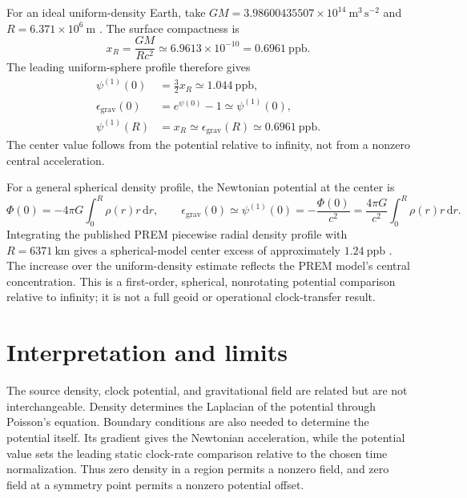 \documentclass[12pt]{article}
\begin{document}
For an ideal uniform-density Earth, take $GM=3.98600435507\times10^{14}\ \mathrm{m^3\,s^{-2}}$ and $R=6.371\times10^6\ \mathrm{m}$ \cite{Park2021}. The surface compactness is
\begin{equation}
  x_R=\frac{GM}{Rc^2}\simeq6.9613\times10^{-10}
  =0.6961\ \mathrm{ppb}.
  \label{eq:earth-compactness}
\end{equation}
The leading uniform-sphere profile therefore gives
\begin{equation}
  \begin{aligned}
    \psi^{(1)}(0)&=\frac{3}{2}x_R\simeq1.044\ \mathrm{ppb},\\
    \epsilon_{\mathrm{grav}}(0)&=e^{\psi(0)}-1\simeq\psi^{(1)}(0),\\
    \psi^{(1)}(R)&=x_R\simeq\epsilon_{\mathrm{grav}}(R)\simeq0.6961\ \mathrm{ppb}.
  \end{aligned}
  \label{eq:earth-uniform-values}
\end{equation}
The center value follows from the potential relative to infinity, not from a nonzero central acceleration.

For a general spherical density profile, the Newtonian potential at the center is
\begin{equation}
  \Phi(0)=-4\pi G\int_0^R\rho(r)r\,\mathrm{d}r,
  \qquad
  \epsilon_{\mathrm{grav}}(0)
  \simeq\psi^{(1)}(0)=-\frac{\Phi(0)}{c^2}
  =\frac{4\pi G}{c^2}\int_0^R\rho(r)r\,\mathrm{d}r.
  \label{eq:center-integral}
\end{equation}
Integrating the published PREM piecewise radial density profile with $R=6371\ \mathrm{km}$ gives a spherical-model center excess of approximately $1.24\ \mathrm{ppb}$ \cite{PREM}. The increase over the uniform-density estimate reflects the PREM model's central concentration. This is a first-order, spherical, nonrotating potential comparison relative to infinity; it is not a full geoid or operational clock-transfer result.

\section{Interpretation and limits}

The source density, clock potential, and gravitational field are related but are not interchangeable. Density determines the Laplacian of the potential through Poisson's equation. Boundary conditions are also needed to determine the potential itself. Its gradient gives the Newtonian acceleration, while the potential value sets the leading static clock-rate comparison relative to the chosen time normalization. Thus zero density in a region permits a nonzero field, and zero field at a symmetry point permits a nonzero potential offset.
\end{document}
